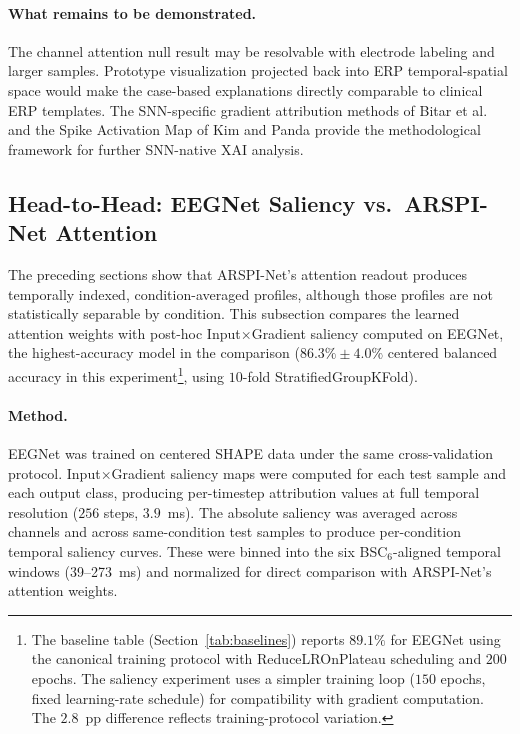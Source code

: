 \paragraph{What remains to be demonstrated.} The channel attention null result may be resolvable with electrode labeling and larger samples. Prototype visualization projected back into ERP temporal-spatial space would make the case-based explanations directly comparable to clinical ERP templates. The SNN-specific gradient attribution methods of Bitar et al.\ \cite{bitar_snn_grad_2023} and the Spike Activation Map of Kim and Panda \cite{kim_sam_2021} provide the methodological framework for further SNN-native XAI analysis.

\subsection{Head-to-Head: EEGNet Saliency vs.\ ARSPI-Net Attention}
\label{sec:shap_comparison}

The preceding sections show that ARSPI-Net's attention readout produces temporally indexed, condition-averaged profiles, although those profiles are not statistically separable by condition. This subsection compares the learned attention weights with post-hoc Input$\times$Gradient saliency computed on EEGNet, the highest-accuracy model in the comparison ($86.3\% \pm 4.0\%$ centered balanced accuracy in this experiment\footnote{The baseline table (Section~\ref{tab:baselines}) reports $89.1\%$ for EEGNet using the canonical training protocol with ReduceLROnPlateau scheduling and $200$ epochs. The saliency experiment uses a simpler training loop ($150$ epochs, fixed learning-rate schedule) for compatibility with gradient computation. The $2.8$~pp difference reflects training-protocol variation.}, using $10$-fold StratifiedGroupKFold).

\paragraph{Method.} EEGNet \cite{lawhern_eegnet_2018} was trained on centered SHAPE data under the same cross-validation protocol. Input$\times$Gradient saliency maps \cite{shrikumar_deeplift_2017} were computed for each test sample and each output class, producing per-timestep attribution values at full temporal resolution ($256$ steps, $3.9$~ms). The absolute saliency was averaged across channels and across same-condition test samples to produce per-condition temporal saliency curves. These were binned into the six BSC$_6$-aligned temporal windows (39--273~ms) and normalized for direct comparison with ARSPI-Net's attention weights.

